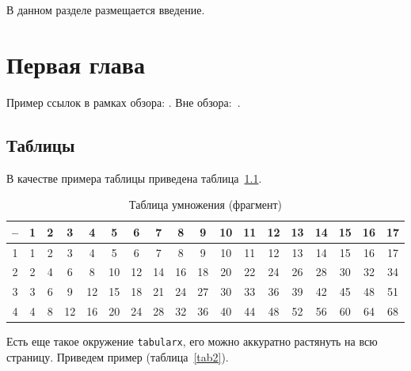 \documentclass[specification,annotation,times]{itmo-student-thesis}
\begin{document}

\tableofcontents

\startprefacepage

В данном разделе размещается введение.

\chapter{Первая глава}

\startrelatedwork
Пример ссылок в рамках обзора: \cite{example-english, example-russian, unrestricted-jump-evco, nsga-ii-steady-state}.
\finishrelatedwork
Вне обзора:~\cite{bellman}.

\section{Таблицы}\label{sec:tables}

В качестве примера таблицы приведена таблица~\ref{tab1}.

\begin{table}[!h]
\caption{Таблица умножения (фрагмент)}\label{tab1}
\centering
\begin{tabular}{|*{18}{c|}}\hline
-- & 1 & 2 & 3 & 4 & 5 & 6 & 7 & 8 & 9 & 10 & 11 & 12 & 13 & 14 & 15 & 16 & 17 \\\hline
1  & 1 & 2 & 3 & 4 & 5 & 6 & 7 & 8 & 9 & 10 & 11 & 12 & 13 & 14 & 15 & 16 & 17 \\\hline
2  & 2 & 4 & 6 & 8 & 10 & 12 & 14 & 16 & 18 & 20 & 22 & 24 & 26 & 28 & 30 & 32 & 34 \\\hline
3  & 3 & 6 & 9 & 12 & 15 & 18 & 21 & 24 & 27 & 30 & 33 & 36 & 39 & 42 & 45 & 48 & 51 \\\hline
4  & 4 & 8 & 12 & 16 & 20 & 24 & 28 & 32 & 36 & 40 & 44 & 48 & 52 & 56 & 60 & 64 & 68 \\\hline
\end{tabular}
\end{table}

Есть еще такое окружение \texttt{tabularx}, его можно аккуратно растянуть на всю страницу.
Приведем пример (таблица~\ref{tab2}).
\end{document}
